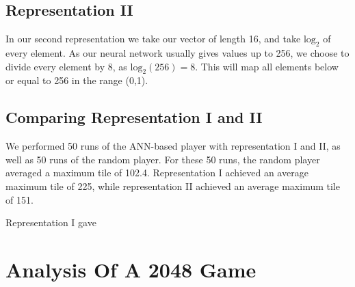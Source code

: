 \documentclass[11pt,a4paper]{article}
\begin{document}
\subsection*{Representation II}
In our second representation we take our vector of length 16, and take $\textrm{log}_2$ of every element. As our neural network usually gives values up to 256, we choose to divide every element by 8, as $\textrm{log}_2(256) = 8$. This will map all elements below or equal to 256 in the range (0,1).

\subsection*{Comparing Representation I and II}
We performed 50 runs of the ANN-based player with representation I and II, as well as 50 runs of the random player. For these 50 runs, the random player averaged a maximum tile of 102.4. Representation I achieved an average maximum tile of 225, while representation II achieved an average maximum tile of 151.

Representation I gave  


\section*{Analysis Of A 2048 Game}
\end{document}

